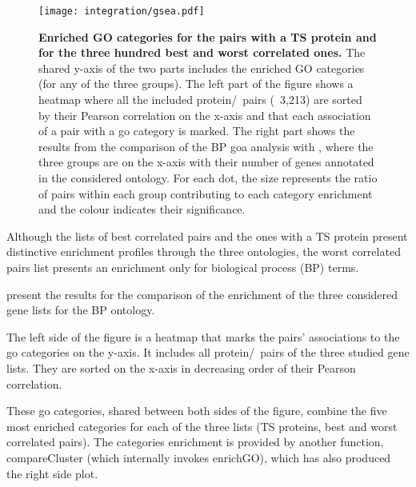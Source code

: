     \begin{sidewaysfigure}
        \texttt{[image: integration/gsea.pdf]}\centering
        \vspace{-3mm}
        \caption[Enriched GO categories for the pairs with a TS proteins and for the
        three hundred best and worst correlated ones]{\label{fig:goares}%
        \textbf{Enriched GO categories for the pairs with a TS protein
        and for the three hundred best and worst correlated ones.}
        The shared y-axis of the two parts includes the enriched GO categories
        (for any of the three groups).
        The left part of the figure shows
        a heatmap where all the included protein/\mRNA\ pairs (\ie\ 3,213)
        are sorted by their Pearson correlation on the x-axis and
        that each association of a pair with a \gls{go} category is marked.
        The right part shows the results from the comparison
        of the BP \gls{goa} analysis with ,
        where the three groups are on the x-axis with their number of genes
        annotated in the considered ontology.
        For each dot, the size represents the ratio of pairs within each group
        contributing to each category enrichment
        and the colour indicates their significance.
        }
    \end{sidewaysfigure}


Although the lists of best correlated pairs and
the ones with a \gls{TS} protein present distinctive enrichment profiles
through the three ontologies,
the worst correlated pairs list presents
an enrichment only for biological process (BP) terms.\\
\vspace{-\baselineskip}

 present the results for
the comparison of the enrichment of the three considered gene lists
for the BP ontology.

The left side of the figure is a heatmap
that marks the pairs' associations to the \gls{go} categories on the y-axis.
It includes all protein/\mRNA\ pairs of the three studied gene lists.
They are sorted on the x-axis in decreasing order of their Pearson correlation.

These \gls{go} categories, shared between both sides of the figure,
combine the five most enriched categories
for each of the three lists (\gls{TS} proteins, best and worst correlated pairs).
The categories enrichment is provided by another  function,
\textsf{compareCluster} (which internally invokes \textsf{enrichGO}),
which has also produced the right side plot.\\
\vspace{-\baselineskip}

